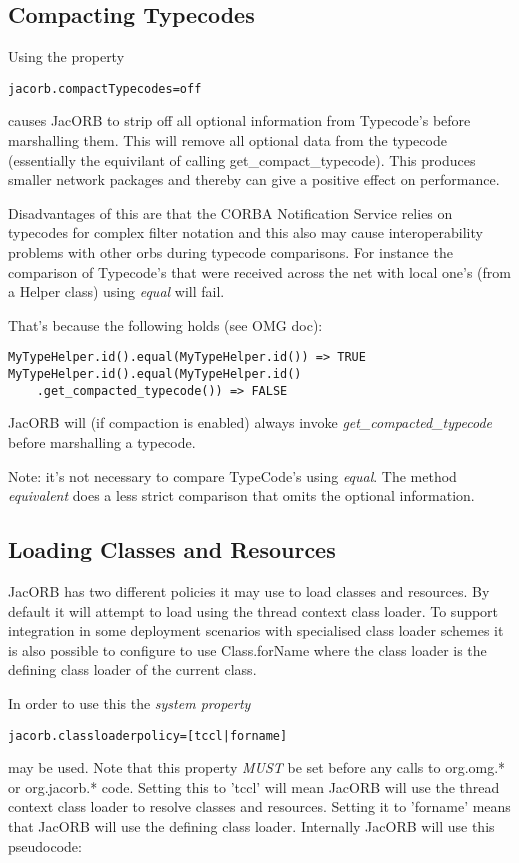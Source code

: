 \subsection{Compacting Typecodes}
\label{compact-typecode}
Using the property
\begin{verbatim}
jacorb.compactTypecodes=off
\end{verbatim}
causes JacORB to strip off all optional information from Typecode's before marshalling them.
This will remove all optional data from the typecode (essentially the equivilant of
calling get\_compact\_typecode). This produces smaller network packages and thereby can give a positive effect on performance.

Disadvantages of this are that the CORBA Notification Service relies on typecodes for complex
filter notation and this also may cause interoperability problems with other orbs during typecode
comparisons. For instance the comparison of Typecode's that were received across the net with
local one's (from a Helper class) using \emph{equal} will fail.

That's because the following holds (see OMG doc):
\begin{verbatim}
MyTypeHelper.id().equal(MyTypeHelper.id()) => TRUE
MyTypeHelper.id().equal(MyTypeHelper.id()
    .get_compacted_typecode()) => FALSE
\end{verbatim}

JacORB will (if compaction is enabled) always invoke \emph{get\_compacted\_typecode} before marshalling a typecode.

Note: it's not necessary to compare TypeCode's using \emph{equal}. The method \emph{equivalent} does a less strict comparison
that omits the optional information.


\subsection{Loading Classes and Resources}
\label{tccl}
JacORB has two different policies it may use to load classes and resources. By default it will attempt to load
using the thread context class loader. To support integration in some deployment scenarios with specialised class
loader schemes it is also possible to configure to use Class.forName where the class loader is the defining class
loader of the current class.

In order to use this the \emph{system property}
\begin{verbatim}
jacorb.classloaderpolicy=[tccl|forname]
\end{verbatim}
may be used. Note that this property \emph{MUST} be set before any calls to org.omg.* or org.jacorb.* code. Setting this
to 'tccl' will mean JacORB will use the thread context class loader to resolve classes and resources. Setting it to
'forname' means that JacORB will use the defining class loader. Internally JacORB will use this pseudocode:


